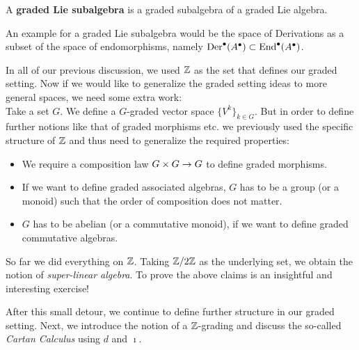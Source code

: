 \begin{definition}
  A \textbf{graded Lie subalgebra} is a graded subalgebra of a graded Lie algebra.
\end{definition}

An example for a graded Lie subalgebra would be the space of Derivations as a subset of the space of endomorphisms, namely $\operatorname{Der}^\bullet(A^\bullet) \subset \operatorname{End}^\bullet(A^\bullet)$.

\begin{rem}
  In all of our previous discussion, we used $\mathbb{Z}$ as the set that defines our graded setting. Now if we would like to generalize the graded setting ideas to more general spaces, we need some extra work:\\

  Take a set $G$. We define a $G$-graded vector space $\{V^k\}_{k \in G}$. But in order to define further notions like that of graded morphisms etc. we previously used the specific structure of $\mathbb{Z}$ and thus need to generalize the required properties:
  \begin{itemize}
    \item We require a composition law $G \times G \rightarrow G$ to define graded morphisms.
    \item If we want to define graded associated algebras, $G$ has to be a group (or a monoid) such that the order of composition does not matter.
    \item $G$ has to be abelian (or a commutative monoid), if we want to define graded commutative algebras.
  \end{itemize}
  So far we did everything on $\mathbb{Z}$. Taking $\mathbb{Z} / 2\mathbb{Z}$ as the underlying set, we obtain the notion of \emph{super-linear algebra}. To prove the above claims is an insightful and interesting exercise!
\end{rem}

After this small detour, we continue to define further structure in our graded setting. Next, we introduce the notion of a $\mathbb{Z}$-grading and discuss the so-called \emph{Cartan Calculus} using $d$ and $\imath$.

